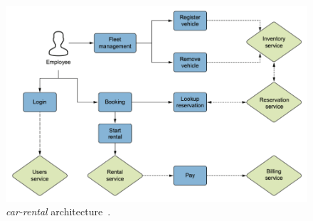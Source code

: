\begin{figure}[htbp]
    \centering
    \includegraphics[width=\textwidth]{images/2-car-rental/architecture.pdf}
    \caption{\textit{car-rental} architecture~\cite{quarkusinaction}.}
    \label{fig:architecture}
\end{figure}

